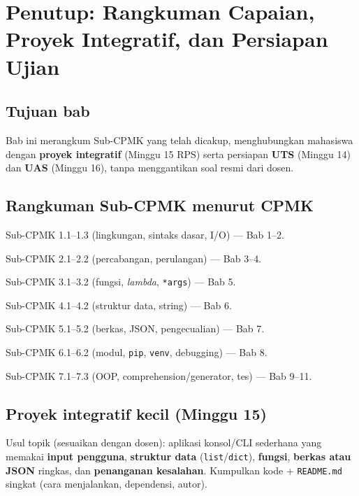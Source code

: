 \documentclass[../main.tex]{subfiles}
\begin{document}
\chapter{Penutup: Rangkuman Capaian, Proyek Integratif, dan Persiapan Ujian}

\section{Tujuan bab}

Bab ini merangkum Sub-CPMK yang telah dicakup, menghubungkan mahasiswa dengan \textbf{proyek integratif} (Minggu 15 RPS) serta persiapan \textbf{UTS} (Minggu 14) dan \textbf{UAS} (Minggu 16), tanpa menggantikan soal resmi dari dosen.

\section{Rangkuman Sub-CPMK menurut CPMK}

\begin{description}[style=nextline, widest=CPMK-7:, itemsep=0.35em]
  \item[CPMK-1:] Sub-CPMK 1.1--1.3 (lingkungan, sintaks dasar, I/O) --- Bab 1--2.
  \item[CPMK-2:] Sub-CPMK 2.1--2.2 (percabangan, perulangan) --- Bab 3--4.
  \item[CPMK-3:] Sub-CPMK 3.1--3.2 (fungsi, \textit{lambda}, \texttt{*args}) --- Bab 5.
  \item[CPMK-4:] Sub-CPMK 4.1--4.2 (struktur data, string) --- Bab 6.
  \item[CPMK-5:] Sub-CPMK 5.1--5.2 (berkas, JSON, pengecualian) --- Bab 7.
  \item[CPMK-6:] Sub-CPMK 6.1--6.2 (modul, \texttt{pip}, \texttt{venv}, debugging) --- Bab 8.
  \item[CPMK-7:] Sub-CPMK 7.1--7.3 (OOP, comprehension/generator, tes) --- Bab 9--11.
\end{description}

\section{Proyek integratif kecil (Minggu 15)}

Usul topik (sesuaikan dengan dosen): aplikasi konsol/CLI sederhana yang memakai \textbf{input pengguna}, \textbf{struktur data} (\texttt{list}/\texttt{dict}), \textbf{fungsi}, \textbf{berkas atau JSON} ringkas, dan \textbf{penanganan kesalahan}. Kumpulkan kode + \texttt{README.md} singkat (cara menjalankan, dependensi, autor).
\end{document}
